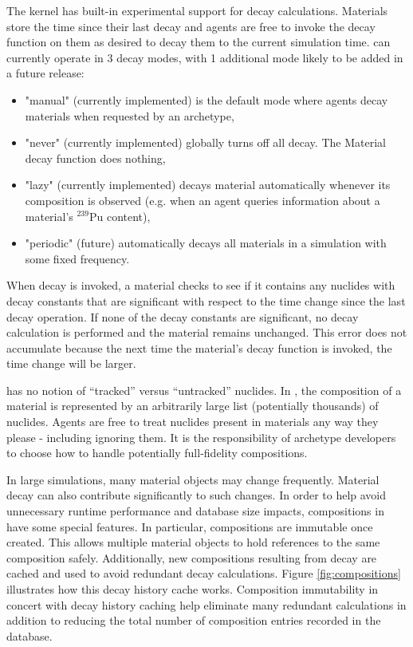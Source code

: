 The \Cyclus kernel has built-in experimental support for decay calculations.
Materials store the time since their last decay and agents are free to
invoke the decay function on them as desired to decay them to the current
simulation time. \Cyclus can currently operate in 3 decay modes, with 1 additional
mode likely to be added in a future release:

\begin{itemize}
    \item "manual" (currently implemented) is the default mode
        where agents decay materials when requested by an archetype,
    \item "never" (currently implemented) globally turns off all decay.
        The Material decay function does nothing,
    \item "lazy" (currently implemented) decays material automatically whenever
         its composition is observed (e.g. when an agent queries information
         about a material's $^{239}$Pu content),
    \item "periodic" (future) automatically decays all materials in a
        simulation with some fixed frequency.
\end{itemize}


When decay is invoked, a material checks to see if it contains any nuclides with
decay constants that are significant with respect to the time change since the
last decay operation.  If none of the decay constants are significant, no decay
calculation is performed and the material remains unchanged.  This error does
not accumulate because the next time the material's decay function is invoked,
the time change will be larger.

\Cyclus has no notion of ``tracked'' versus ``untracked'' nuclides.  In
\Cyclus, the composition of a material is represented by an arbitrarily large
list (potentially thousands) of nuclides.  Agents are free to treat nuclides
present in materials any way they please - including ignoring them.  It is the
responsibility of archetype developers to choose how to handle potentially
full-fidelity compositions.

In large simulations, many material objects may change frequently.  Material
decay can also contribute significantly to such changes.  In order to help
avoid unnecessary runtime performance and database size impacts, compositions
in \Cyclus have some special features.  In particular, compositions are
immutable once created. This allows multiple material objects to hold
references to the same composition safely.  Additionally, new compositions
resulting from decay are cached and used to avoid redundant decay
calculations.  Figure \ref{fig:compositions} illustrates how this decay
history cache works. Composition immutability in concert with decay history
caching help eliminate many redundant calculations in addition to reducing the
total number of composition entries recorded in the database.



